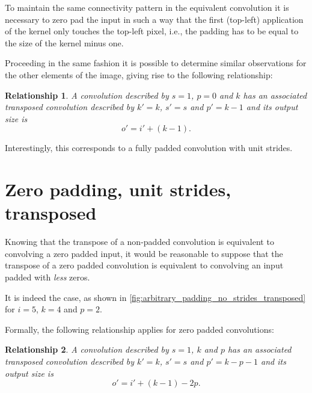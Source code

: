 \documentclass[notitlepage]{report}
\newtheorem{relationship}{Relationship}
\begin{document}
To maintain the same connectivity pattern in the equivalent convolution it is
necessary to zero pad the input in such a way that the first (top-left)
application of the kernel only touches the top-left pixel, i.e., the padding
has to be equal to the size of the kernel minus one.

Proceeding in the same fashion it is possible to determine similar observations
for the other elements of the image, giving rise to the following relationship:

\begin{relationship}\label{rel:no_padding_no_strides_transposed}
A convolution described by $s = 1$, $p = 0$ and $k$ has an associated
transposed convolution described by $k' = k$, $s' = s$ and $p' = k - 1$ and its
output size is
\begin{equation*}
    o' = i' + (k - 1).
\end{equation*}
\end{relationship}

Interestingly, this corresponds to a fully padded convolution with unit
strides.

\section{Zero padding, unit strides, transposed}

Knowing that the transpose of a non-padded convolution is equivalent to
convolving a zero padded input, it would be reasonable to suppose that the
transpose of a zero padded convolution is equivalent to convolving an input
padded with {\em less\/} zeros.

It is indeed the case, as shown in
\autoref{fig:arbitrary_padding_no_strides_transposed} for $i = 5$, $k = 4$ and
$p = 2$.

Formally, the following relationship applies for zero padded convolutions:

\begin{relationship}\label{rel:arbitrary_padding_no_strides_transposed}
A convolution described by $s = 1$, $k$ and $p$ has an
associated transposed convolution described by $k' = k$, $s' = s$ and $p' = k -
p - 1$ and its output size is
\begin{equation*}
    o' = i' + (k - 1) - 2p.
\end{equation*}
\end{relationship}
\end{document}
